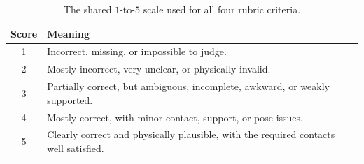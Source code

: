 \begin{table}[t]
  \centering
  \caption[Shared vision-language rubric scale.]{The shared $1$-to-$5$ scale used for all four rubric criteria.}
  \label{tab:vlm-scale}
  \begin{tabularx}{\textwidth}{@{}cX@{}}
    \toprule
    Score & Meaning \\
    \midrule
    1 & Incorrect, missing, or impossible to judge. \\
    2 & Mostly incorrect, very unclear, or physically invalid. \\
    3 & Partially correct, but ambiguous, incomplete, awkward, or weakly supported. \\
    4 & Mostly correct, with minor contact, support, or pose issues. \\
    5 & Clearly correct and physically plausible, with the required contacts well satisfied. \\
    \bottomrule
  \end{tabularx}
\end{table}
 
